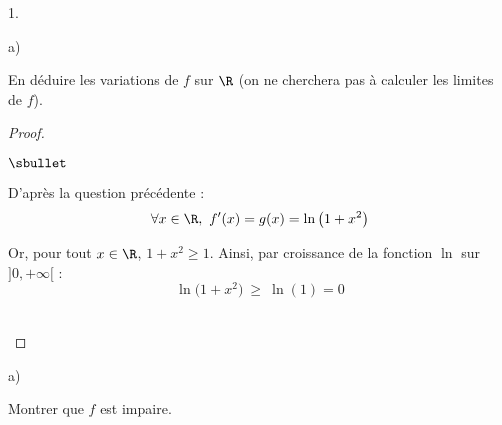 \documentclass[11pt]{article}%
\begin{document}
\begin{noliste}{1.}
\begin{noliste}{a)}
  \item En déduire les variations de $f$ sur $\R$ (on ne cherchera pas
    à calculer les limites de $f$).

    \begin{proof}~%
      \begin{noliste}{$\sbullet$}
      \item D'après la question précédente :
        \[
        \forall x \in \R, \ f'(x) = g(x) = \ln\big( 1 + x^2 \big)
        \]

      \item Or, pour tout $x \in \R$, $1 + x^2 \geq 1$. Ainsi, par
        croissance de la fonction $\ln$ sur $]0, +\infty[$ :
        \[
        \ln\big( 1 + x^2 \big) \ \geq \ \ln(1) = 0
        \]        
      \end{noliste}
      ~\\[-1.2cm]
    \end{proof}
  \end{noliste}


\newpage


\item 
  \begin{noliste}{a)}
    \setlength{\itemsep}{2mm}
  \item Montrer que $f$ est impaire.


\end{noliste}
\end{noliste}
\end{document}
